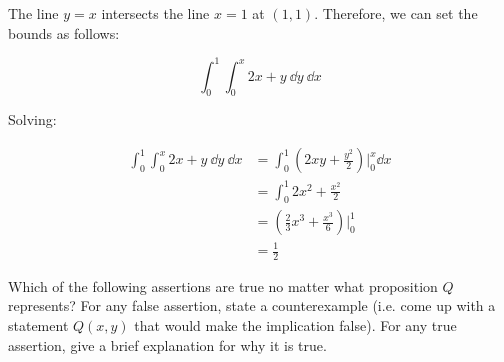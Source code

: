 \documentclass[11pt]{article}
\begin{document}
\begin{Parts}
    \begin{solution}
    The line $y = x$ intersects the line $x = 1$ at $(1, 1)$. Therefore, we can set the bounds as follows: 

    \[ \int_0^1\int_0^x 2x + y \ \dd y \ \dd x\]

    Solving: 

    \begin{align*}
        \int_0^1\int_0^x 2x + y \ \dd y \ \dd x &= \int_0^1 (2xy + \frac{y^2}{2})\bigg\rvert_0^x \dd x\\
        &= \int_0^1 2x^2 + \frac{x^2}{2}\\
        &= \left(\frac{2}{3}x^3 + \frac{x^3}{6}\right)\bigg\rvert_0^1\\
        &= \frac{1}{2}
    \end{align*}

    \end{solution}
\end{Parts}

Which of the following assertions are true no matter what proposition $Q$ represents? For any false assertion, state a counterexample (i.e. come up with a statement $Q(x, y)$ that would make the implication false). For any true assertion, give a brief explanation for why it is true.
\end{document}
